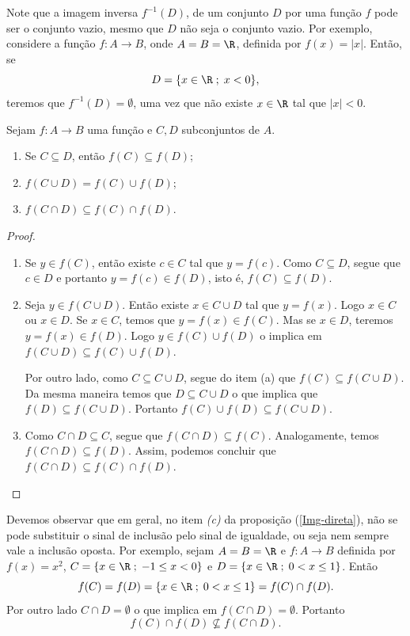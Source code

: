Note que a imagem inversa $f^{-1}(D)$, de um conjunto $D$ por uma
fun\c{c}\~ao $f$ pode ser o conjunto vazio, mesmo que $D$ n\~ao seja o
conjunto vazio. Por exemplo, considere a fun\c{c}\~ao $f:A \rightarrow
B$, onde $A=B=\R$, definida por $f(x)=|x|$. Ent\~ao, se $$D=\{x \in
\R\;;\; x<0\},$$ teremos que $f^{-1}(D)=\emptyset$, uma vez que
n\~ao existe $x \in \R$ tal que $|x|<0$.

\begin{proposition}\label{Img-direta}
Sejam $f:A \rightarrow B$ uma fun\c{c}\~ao e $C, D$ subconjuntos de $A$.
\begin{enumerate}
    \item[(a)] Se $C \subseteq D$, ent\~ao $f(C)\subseteq f(D)$;
    \item[(b)] $f(C \cup D)=f(C)\cup f(D)$;
    \item[(c)] $f(C \cap D) \subseteq f(C)\cap f(D)$.
\end{enumerate}
\end{proposition}
\begin{proof}\mbox{}
\begin{enumerate}
    \item[(a)] Se $y \in f(C)$, ent\~ao existe $c \in C$ tal que $y
    = f(c)$. Como $C \subseteq D$, segue que $c \in D$ e portanto
    $y=f(c) \in f(D)$, isto \'e, $f(C)\subseteq f(D)$.
    \item[(b)] Seja $y \in f(C \cup D)$. Ent\~ao existe $x \in C \cup
    D$ tal que $y=f(x)$. Logo $x \in C$ ou $x \in D$. Se $x \in
    C$, temos que $y=f(x) \in f(C)$. Mas se $x \in D$, teremos
    $y=f(x) \in f(D)$. Logo $y \in f(C) \cup f(D)$ o implica em
    $f(C \cup D)\subseteq f(C)\cup f(D)$.

    Por outro lado, como $C \subseteq C \cup D$, segue do item (a)
    que $f(C) \subseteq f(C \cup D)$. Da mesma maneira temos que $D
    \subseteq C \cup D$ o que implica que $f(D) \subseteq f(C \cup D)$.
    Portanto $f(C)\cup f(D)\subseteq f(C \cup D)$.
    \item[(c)] Como $C \cap D \subseteq C$, segue que $f(C\cap D)
    \subseteq f(C)$. Analogamente, temos $f(C\cap D)\subseteq
    f(D)$. Assim, podemos concluir que $f(C \cap D) \subseteq
    f(C)\cap f(D)$.
\end{enumerate}
\end{proof}

Devemos observar que em geral, no item \emph{(c)} da proposi\c{c}\~ao
(\ref{Img-direta}), n\~ao se pode substituir o sinal de inclus\~ao
pelo sinal de igualdade, ou seja nem sempre vale a inclus\~ao
oposta. Por exemplo, sejam $A=B=\R$ e $f:A \rightarrow B$ definida
por $f(x)=x^2$, $C=\{x \in \R\;;\; -1 \leq x <0\}$ e $D=\{x \in \R
\;;\; 0 <x \leq 1\}$. Ent\~ao
$$
f(C)=f(D)=\{x \in \R \;;\; 0 <x \leq 1\}=f(C)\cap f(D).
$$
Por outro lado $C \cap D= \emptyset$ o que implica em $f(C \cap
D)=\emptyset$. Portanto $$f(C)\cap f(D) \nsubseteq f(C \cap D).$$


